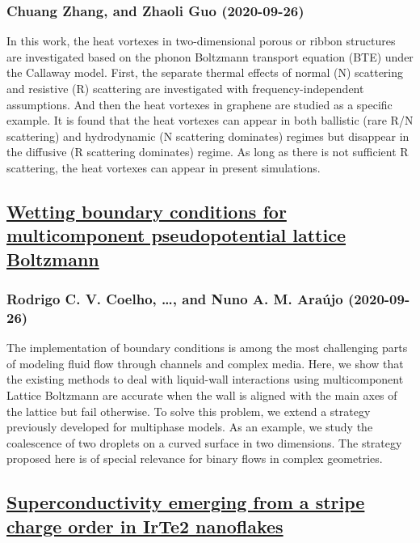 \subsubsection*{Chuang Zhang, and Zhaoli Guo (2020-09-26)}
In this work, the heat vortexes in two-dimensional porous or ribbon
structures are investigated based on the phonon Boltzmann transport equation
(BTE) under the Callaway model. First, the separate thermal effects of normal
(N) scattering and resistive (R) scattering are investigated with
frequency-independent assumptions. And then the heat vortexes in graphene are
studied as a specific example. It is found that the heat vortexes can appear in
both ballistic (rare R/N scattering) and hydrodynamic (N scattering dominates)
regimes but disappear in the diffusive (R scattering dominates) regime. As long
as there is not sufficient R scattering, the heat vortexes can appear in
present simulations.

\subsection*{\href{http://arxiv.org/abs/2009.12584v1}{Wetting boundary conditions for multicomponent pseudopotential lattice  Boltzmann}}
\subsubsection*{Rodrigo C. V. Coelho, \dots, and Nuno A. M. Araújo (2020-09-26)}
The implementation of boundary conditions is among the most challenging parts
of modeling fluid flow through channels and complex media. Here, we show that
the existing methods to deal with liquid-wall interactions using multicomponent
Lattice Boltzmann are accurate when the wall is aligned with the main axes of
the lattice but fail otherwise. To solve this problem, we extend a strategy
previously developed for multiphase models. As an example, we study the
coalescence of two droplets on a curved surface in two dimensions. The strategy
proposed here is of special relevance for binary flows in complex geometries.

\subsection*{\href{http://arxiv.org/abs/2009.12578v1}{Superconductivity emerging from a stripe charge order in IrTe2  nanoflakes}}
